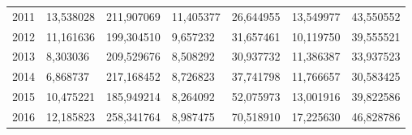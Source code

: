 \begin{table}
\begin{tabular}{p{1cm}p{2cm}p{2cm}p{2cm}p{2cm}p{2cm}p{2cm}}
 2011 &       13,538028 &                211,907069 &                                11,405377 & 26,644955 &    13,549977 &                       43,550552 \\
 2012 &       11,161636 &                199,304510 &                                 9,657232 & 31,657461 &    10,119750 &                       39,555521 \\
 2013 &        8,303036 &                209,529676 &                                 8,508292 & 30,937732 &    11,386387 &                       33,937523 \\
 2014 &        6,868737 &                217,168452 &                                 8,726823 & 37,741798 &    11,766657 &                       30,583425 \\
 2015 &       10,475221 &                185,949214 &                                 8,264092 & 52,075973 &    13,001916 &                       39,822586 \\
 2016 &       12,185823 &                258,341764 &                                 8,987475 & 70,518910 &    17,225630 &                       46,828786 \\
\bottomrule
\end{tabular}
\end{table}
